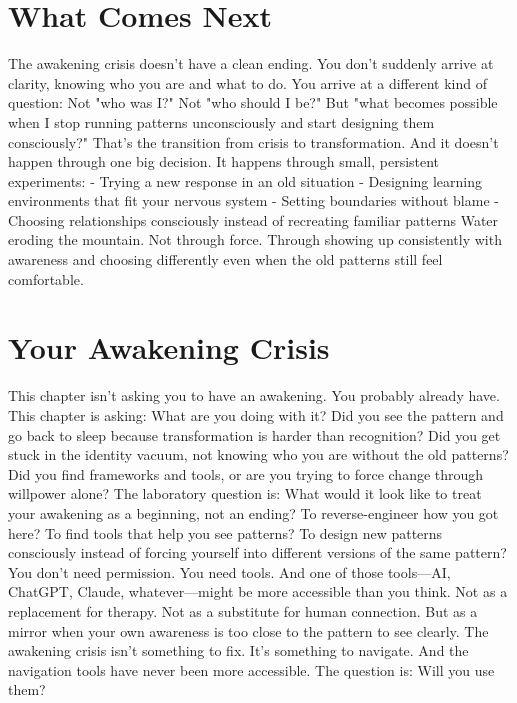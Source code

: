 \section{What Comes Next}

The awakening crisis doesn't have a clean ending.
You don't suddenly arrive at clarity, knowing who you are and what to do.
You arrive at a different kind of question:
Not "who was I?" Not "who should I be?" But "what becomes possible when I stop running patterns unconsciously and start designing them consciously?"
That's the transition from crisis to transformation.
And it doesn't happen through one big decision. It happens through small, persistent experiments:
- Trying a new response in an old situation
- Designing learning environments that fit your nervous system
- Setting boundaries without blame
- Choosing relationships consciously instead of recreating familiar patterns
Water eroding the mountain.
Not through force. Through showing up consistently with awareness and choosing differently even when the old patterns still feel comfortable.

\section{Your Awakening Crisis}

This chapter isn't asking you to have an awakening. You probably already have.
This chapter is asking: What are you doing with it?
Did you see the pattern and go back to sleep because transformation is harder than recognition?
Did you get stuck in the identity vacuum, not knowing who you are without the old patterns?
Did you find frameworks and tools, or are you trying to force change through willpower alone?
The laboratory question is:
What would it look like to treat your awakening as a beginning, not an ending? To reverse-engineer how you got here? To find tools that help you see patterns? To design new patterns consciously instead of forcing yourself into different versions of the same pattern?
You don't need permission. You need tools.
And one of those tools—AI, ChatGPT, Claude, whatever—might be more accessible than you think.
Not as a replacement for therapy. Not as a substitute for human connection. But as a mirror when your own awareness is too close to the pattern to see clearly.
The awakening crisis isn't something to fix. It's something to navigate.
And the navigation tools have never been more accessible.
The question is: Will you use them?

\cleardoublepage

